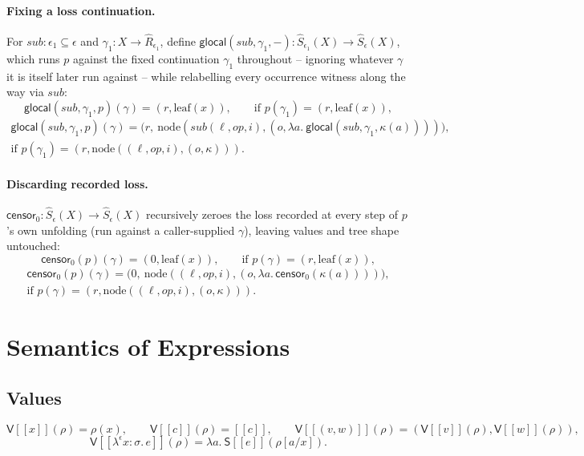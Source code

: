 \documentclass[11pt]{article}
\theoremstyle{plain}
\newcommand{\Ssem}[1]{\mathsf{S}[\![#1]\!]}
\newcommand{\Vsem}[1]{\mathsf{V}[\![#1]\!]}
\newcommand{\Rm}[1]{\widehat{R}_{#1}}
\newcommand{\Sm}[1]{\widehat{S}_{#1}}
\newcommand{\eps}{\epsilon}
\newcommand{\op}{\mathit{op}}
\newcommand{\censor}{\mathsf{censor}_0}
\newcommand{\glocalOp}{\mathsf{glocal}}
\begin{document}
\paragraph{Fixing a loss continuation.} For $\mathit{sub}:\eps_1\subseteq\eps$ and
$\gamma_1:X\to\Rm{\eps_1}$, define $\glocalOp(\mathit{sub},\gamma_1,-):\Sm{\eps_1}(X)\to\Sm\eps(X)$,
which runs $p$ against the fixed continuation $\gamma_1$ throughout -- ignoring whatever
$\gamma$ it is itself later run against -- while relabelling every occurrence witness along
the way via $\mathit{sub}$:
\[
  \glocalOp(\mathit{sub},\gamma_1,p)(\gamma) = (r,\mathrm{leaf}(x)), \qquad \text{if } p(\gamma_1) = (r,\mathrm{leaf}(x)),
\]
\begin{multline*}
  \glocalOp(\mathit{sub},\gamma_1,p)(\gamma) = \big(r,\ \mathrm{node}(\mathit{sub}(\ell,\op,i),(o,\lambda a.\ \glocalOp(\mathit{sub},\gamma_1,\kappa(a))))\big), \\
  \text{if } p(\gamma_1) = (r,\mathrm{node}((\ell,\op,i),(o,\kappa))).
\end{multline*}

\paragraph{Discarding recorded loss.} $\censor:\Sm\eps(X)\to\Sm\eps(X)$ recursively zeroes
the loss recorded at every step of $p$'s own unfolding (run against a caller-supplied
$\gamma$), leaving values and tree shape untouched:
\[
  \censor(p)(\gamma) = (0,\mathrm{leaf}(x)), \qquad \text{if } p(\gamma) = (r,\mathrm{leaf}(x)),
\]
\begin{multline*}
  \censor(p)(\gamma) = \big(0,\ \mathrm{node}((\ell,\op,i),(o,\lambda a.\,\censor(\kappa(a))))\big), \\
  \text{if } p(\gamma) = (r,\mathrm{node}((\ell,\op,i),(o,\kappa))).
\end{multline*}

\section{Semantics of Expressions}

\subsection{Values}

\[
  \Vsem{x}(\rho) = \rho(x), \qquad
  \Vsem{c}(\rho) = [\![c]\!], \qquad
  \Vsem{(v,w)}(\rho) = (\Vsem{v}(\rho),\Vsem{w}(\rho)),
\]
\[
  \Vsem{\lambda^\eps x{:}\sigma.\,e}(\rho) = \lambda a.\ \Ssem{e}(\rho[a/x]).
\]
\end{document}
